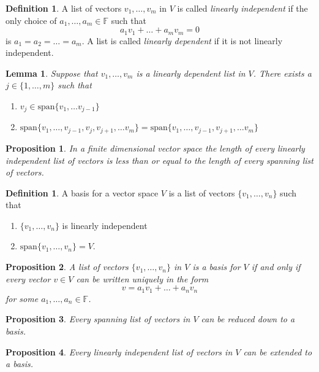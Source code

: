 \documentclass[12pt,letterpaper]{amsart}
\theoremstyle{plain}
\newtheorem{proposition}{Proposition}[section]
\newtheorem{lemma}[theorem]{Lemma}
\theoremstyle{definition}
\newtheorem{definition}[theorem]{Definition}
\numberwithin{equation}{section}
\begin{document}
\begin{definition} A list of vectors $v_1,\ldots, v_m$ in $V$ is called \emph{linearly independent} if the only choice of $a_1, \ldots, a_m\in \mathbb{F}$ such that 
\[a_1v_1+\ldots+a_mv_m=0\] is $a_1=a_2=\ldots =a_m$. A list is called \emph{linearly dependent} if it is not linearly independent.
\end{definition}
\newpage
\begin{lemma} Suppose that $v_1,\ldots, v_m$ is a linearly dependent list in $V$. There exists a $j\in\{1,\ldots, m\}$ such that \\
\begin{enumerate}[1)]
\item $v_j\in \text{span}\{v_1,\ldots v_{j-1}\}$
\item $\text{span}\{v_1,\ldots, v_{j-1},v_j,v_{j+1},\ldots v_m\}=\text{span}\{v_1,\ldots, v_{j-1},v_{j+1},\ldots v_m\}$
\end{enumerate}
\end{lemma}

\begin{proposition} In a finite dimensional vector space the length of every linearly independent list of vectors is less than or equal to the length of every spanning list of vectors. 
\end{proposition}


\begin{definition} A basis for a vector space $V$ is a list of vectors $\{v_1, \ldots, v_n\}$ such that 
\begin{enumerate}[1.]
\item $\{v_1, \ldots, v_n\}$ is linearly independent
\item $\text{span}\{v_1, \ldots, v_n\}=V$. 
\end{enumerate}
\end{definition}
\begin{proposition} A list of vectors $\{v_1, \ldots, v_n\}$ in $V$ is a basis for $V$ if and only if every vector $v\in V$ can be written \emph{uniquely} in the form
\[v=a_1v_1+\ldots+a_nv_n\]
for some $a_1, \ldots, a_n\in \mathbb{F}$. 
\end{proposition}
\begin{proposition} Every spanning list of vectors in $V$ can be reduced down to a basis. 
\end{proposition}

\begin{proposition} Every linearly independent list of vectors in $V$ can be extended to a basis.  
\end{proposition}
\end{document}
